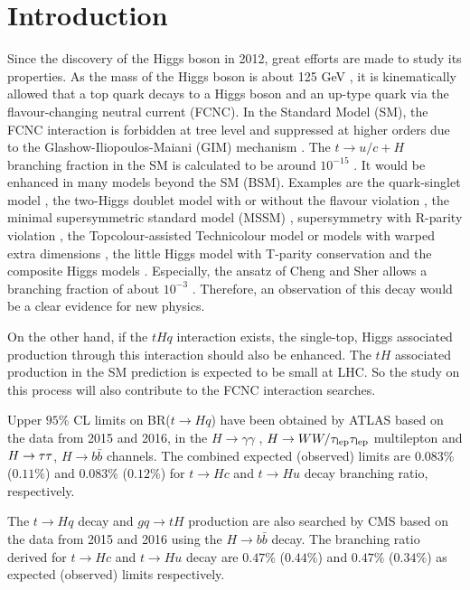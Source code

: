 \section{Introduction}
\label{sec:intro}
Since the discovery of the Higgs boson in 2012, great efforts are made to study its properties. As the mass of the Higgs boson is about 125 GeV \cite{HiggsMass}, it is kinematically allowed that a top quark decays to a Higgs boson and an up-type quark via the flavour-changing neutral current (FCNC). In the Standard Model (SM), the FCNC interaction is forbidden at tree level and suppressed at higher orders due to the Glashow-Iliopoulos-Maiani (GIM) mechanism \cite{GIM}. The $t\to u/c+H$ branching fraction in the SM is calculated to be around $10^{-15}$ \cite{brtch3}. It would be enhanced in many models beyond the SM (BSM). Examples are the quark-singlet model \cite{quarkSinglet1,quarkSinglet2}, the two-Higgs doublet model with or without the flavour violation \cite{2hdm1,2hdm2}, the minimal supersymmetric standard model (MSSM) \cite{2hdm3}, supersymmetry with R-parity violation \cite{Rparity},
the Topcolour-assisted Technicolour model \cite{Techni} or models with warped extra dimensions \cite{extraD}, the little Higgs model with T-parity conservation \cite{littleH} and the composite Higgs models \cite{compositeH}.
Especially, the ansatz of Cheng and Sher \cite{Sher} allows a branching fraction of about $10^{-3}$ \cite{FCNC_rate}. Therefore, an observation of this decay would be a clear evidence for new physics.

On the other hand, if the $tHq$ interaction exists, the single-top, Higgs associated production through this interaction should also be enhanced. The $tH$ associated production in the SM prediction is expected to be small at LHC\cite{tHjb_production}. So the study on this process will also contribute to the FCNC interaction searches.

Upper $95\%$ CL limits on BR($t\to Hq$) have been obtained by ATLAS based on the data from 2015 and 2016, in the $H\to\gamma\gamma$ \cite{fcncgmgm}, $H\to WW/\tau_\text{lep}{}\tau_\text{lep}$ multilepton \cite{fcncml} and  $H \rightarrow \tau\tau$, $H\to b\bar{b}$ \cite{fcnctautau} channels. The combined expected (observed) limits are $0.083\%$ ($0.11\%$) and $0.083\%$ ($0.12\%$) for $t\to Hc$ and $t\to Hu$ decay branching ratio, respectively.

The $t\to Hq$ decay and $gq\to tH$ production are also searched by CMS based on the data from 2015 and 2016\cite{CMS-TOP-17-003} using the $H\to b\bar{b}$ decay. The branching ratio derived for $t\to Hc$ and $t\to Hu$ decay are $0.47\%$ ($0.44\%$) and $0.47\%$ ($0.34\%$) as expected (observed) limits respectively.

